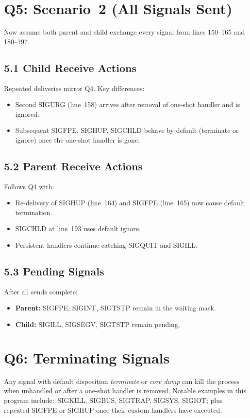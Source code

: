 \documentclass[12pt]{article}
\begin{document}
	\section*{Q5: Scenario 2 (All Signals Sent)}
	Now assume both parent and child exchange every signal from lines 150--165 and 180--197.
	
	\subsection*{5.1 Child Receive Actions}
	Repeated deliveries mirror Q4. Key differences:
	\begin{itemize}
		\item Second SIGURG (line 158) arrives after removal of one-shot handler and is ignored.
		\item Subsequent SIGFPE, SIGHUP, SIGCHLD behave by default (terminate or ignore) once the one-shot handler is gone.
	\end{itemize}
	
	\subsection*{5.2 Parent Receive Actions}
	Follows Q4 with:
	\begin{itemize}
		\item Re-delivery of SIGHUP (line 164) and SIGFPE (line 165) now cause default termination.
		\item SIGCHLD at line 193 uses default ignore.
		\item Persistent handlers continue catching SIGQUIT and SIGILL.
	\end{itemize}
	
	\subsection*{5.3 Pending Signals}
	After all sends complete:
	\begin{itemize}
		\item \textbf{Parent:} SIGFPE, SIGINT, SIGTSTP remain in the waiting mask.
		\item \textbf{Child:} SIGILL, SIGSEGV, SIGTSTP remain pending.
	\end{itemize}
	
	\section*{Q6: Terminating Signals}
	Any signal with default disposition \textit{terminate} or \textit{core dump} can kill the process when unhandled or after a one-shot handler is removed. Notable examples in this program include:\
	SIGKILL, SIGBUS, SIGTRAP, SIGSYS, SIGIOT; plus repeated SIGFPE or SIGHUP once their custom handlers have executed.
	
\end{document}
